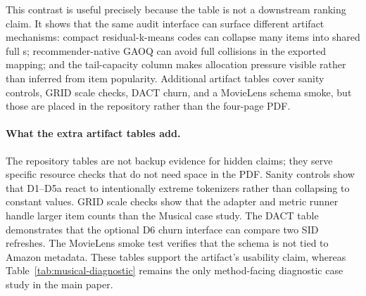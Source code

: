 This contrast is useful precisely because the table is not a downstream
ranking claim. It shows that the same audit interface can surface different
artifact mechanisms: compact residual-k-means codes can collapse many items
into shared full \sid{}s; recommender-native GAOQ can avoid full collisions in
the exported mapping; and the tail-capacity column makes allocation pressure
visible rather than inferred from item popularity. Additional artifact tables
cover sanity controls, GRID scale checks, DACT churn, and a MovieLens schema
smoke, but those are placed in the repository rather than the four-page PDF.

\paragraph{What the extra artifact tables add.}
The repository tables are not backup evidence for hidden claims; they serve
specific resource checks that do not need space in the PDF. Sanity controls
show that D1--D5a react to intentionally extreme tokenizers rather than
collapsing to constant values. GRID scale checks show that the adapter and
metric runner handle larger item counts than the Musical case study. The DACT
table demonstrates that the optional D6 churn interface can compare two SID
refreshes. The MovieLens smoke test verifies that the schema is not tied to
Amazon metadata. These tables support the artifact's usability claim, whereas
Table~\ref{tab:musical-diagnostic} remains the only method-facing diagnostic
case study in the main paper.
